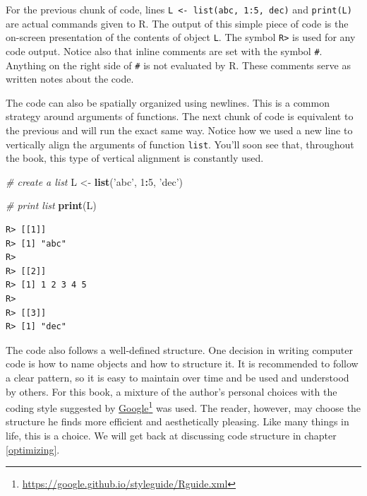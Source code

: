 \documentclass[
  12pt,
]{book}
\newenvironment{Shaded}{\begin{snugshade}}{\end{snugshade}}
\newcommand{\CommentTok}[1]{\textcolor[rgb]{0.37,0.37,0.37}{\textit{#1}}}
\newcommand{\DecValTok}[1]{\textcolor[rgb]{0.06,0.06,0.06}{#1}}
\newcommand{\KeywordTok}[1]{\textcolor[rgb]{0.27,0.27,0.27}{\textbf{#1}}}
\newcommand{\NormalTok}[1]{#1}
\newcommand{\OperatorTok}[1]{\textcolor[rgb]{0.43,0.43,0.43}{\textbf{#1}}}
\newcommand{\StringTok}[1]{\textcolor[rgb]{0.5,0.5,0.5}{#1}}
\begin{document}
For the previous chunk of code, lines \texttt{L\ \textless{}-\ list(\textquotesingle{}abc\textquotesingle{},\ 1:5,\ \textquotesingle{}dec\textquotesingle{})} and \texttt{print(L)} are actual commands given to R. The output of this simple piece of code is the on-screen presentation of the contents of object \texttt{L}. The symbol \texttt{R\textgreater{}} is used for any code output. Notice also that inline comments are set with the symbol \texttt{\#}. Anything on the right side of \texttt{\#} is not evaluated by R. These comments serve as written notes about the code.

The code can also be spatially organized using newlines. This is a common strategy around arguments of functions. The next chunk of code is equivalent to the previous and will run the exact same way. Notice how we used a new line to vertically align the arguments of function \texttt{list}. You'll soon see that, throughout the book, this type of vertical alignment is constantly used.

\begin{Shaded}
\begin{Highlighting}[]
\CommentTok{# create a list}
\NormalTok{L <-}\StringTok{ }\KeywordTok{list}\NormalTok{(}\StringTok{'abc'}\NormalTok{, }
          \DecValTok{1}\OperatorTok{:}\DecValTok{5}\NormalTok{, }
          \StringTok{'dec'}\NormalTok{)}

\CommentTok{# print list}
\KeywordTok{print}\NormalTok{(L)}
\end{Highlighting}
\end{Shaded}

\begin{verbatim}
R> [[1]]
R> [1] "abc"
R> 
R> [[2]]
R> [1] 1 2 3 4 5
R> 
R> [[3]]
R> [1] "dec"
\end{verbatim}

The code also follows a well-defined structure. One decision in writing computer code is how to name objects and how to structure it. It is recommended to follow a clear pattern, so it is easy to maintain over time and be used and understood by others. For this book, a mixture of the author's personal choices with the coding style suggested by \href{https://google.github.io/styleguide/Rguide.xml}{Google}\footnote{\url{https://google.github.io/styleguide/Rguide.xml}} was used. The reader, however, may choose the structure he finds more efficient and aesthetically pleasing. Like many things in life, this is a choice. We will get back at discussing code structure in chapter \ref{optimizing}.
\end{document}
